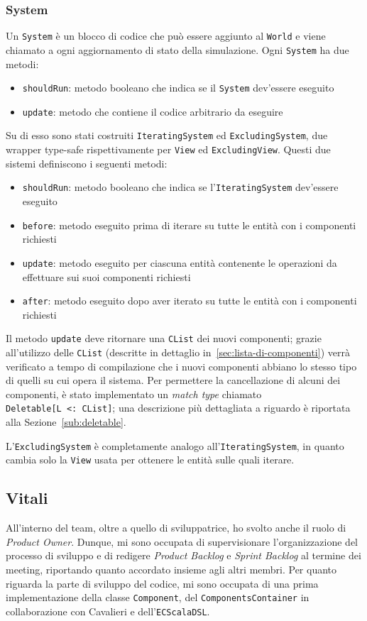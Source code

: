 \subsubsection{System}

Un \texttt{System} è un blocco di codice che può essere aggiunto al \texttt{World} e viene chiamato a ogni aggiornamento
di stato della simulazione.
Ogni \texttt{System} ha due metodi:
\begin{itemize}
    \item \texttt{shouldRun}: metodo booleano che indica se il \texttt{System} dev'essere eseguito
    \item \texttt{update}: metodo che contiene il codice arbitrario da eseguire
\end{itemize}

Su di esso sono stati costruiti \texttt{IteratingSystem} ed \texttt{ExcludingSystem}, due wrapper type-safe
rispettivamente per \texttt{View} ed \texttt{ExcludingView}.
Questi due sistemi definiscono i seguenti metodi:
\begin{itemize}
    \item \texttt{shouldRun}: metodo booleano che indica se l'\texttt{IteratingSystem} dev'essere eseguito
    \item \texttt{before}: metodo eseguito prima di iterare su tutte le entità con i componenti richiesti
    \item \texttt{update}: metodo eseguito per ciascuna entità contenente le operazioni da effettuare sui suoi
    componenti richiesti
    \item \texttt{after}: metodo eseguito dopo aver iterato su tutte le entità con i componenti richiesti
\end{itemize}

Il metodo \texttt{update} deve ritornare una \texttt{CList} dei nuovi componenti;
grazie all'utilizzo delle \texttt{CList} (descritte in dettaglio in~\ref{sec:lista-di-componenti}) verrà verificato a
tempo di compilazione che i nuovi componenti abbiano lo stesso tipo di quelli su cui opera il sistema.
Per permettere la cancellazione di alcuni dei componenti, è stato implementato un \textit{match type} chiamato
\texttt{Deletable[L~<:~CList]}; una descrizione più dettagliata a riguardo è riportata alla Sezione~\ref{sub:deletable}.

L'\texttt{ExcludingSystem} è completamente analogo all'\texttt{IteratingSystem}, in quanto cambia solo la \texttt{View}
usata per ottenere le entità sulle quali iterare.

\subsection{Vitali}\label{subsec:linda-vitali}
All'interno del team, oltre a quello di sviluppatrice, ho svolto anche il ruolo di \textit{Product Owner}.
Dunque, mi sono occupata di supervisionare l'organizzazione del processo di sviluppo e di redigere \textit{Product Backlog}
e \textit{Sprint Backlog} al termine dei meeting, riportando quanto accordato insieme agli altri membri.
Per quanto riguarda la parte di sviluppo del codice, mi sono occupata di una prima implementazione della classe \texttt{Component},
del \texttt{ComponentsContainer} in collaborazione con Cavalieri e dell'\texttt{ECScalaDSL}.

